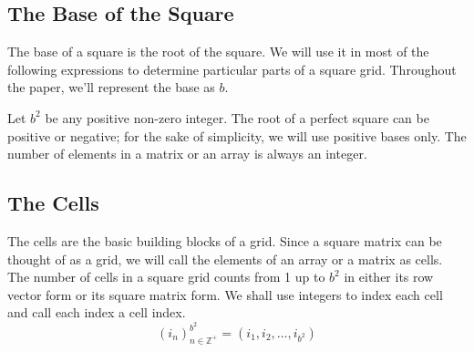 \documentclass[letterpaper, twoside,12pt]{article}
\begin{document}
    \subsection{The Base of the Square} \label{base}
    The base of a square is the root of the square. We will use it in most of the following expressions to determine particular parts of a square grid. Throughout the paper, we'll represent the base as $b$. 

    Let $b^2$ be any positive non-zero integer. The root of a perfect square can be positive or negative; for the sake of simplicity, we will use positive bases only. The number of elements in a matrix or an array is always an integer.

    \subsection{The Cells} \label{cells}
    The cells are the basic building blocks of a grid. Since a square matrix can be thought of as a grid, we will call the elements of an array or a matrix as cells. The number of cells in a square grid counts from 1 up to $b^2$ in either its row vector form or its square matrix form. We shall use integers to index each cell and call each index a cell index.
    \begin{equation}
        (i_n)^{b^2}_{n\in\mathbb{Z}^+} = (i_1, i_2, \dots ,i_{b^2})
    \end{equation}
\end{document}
